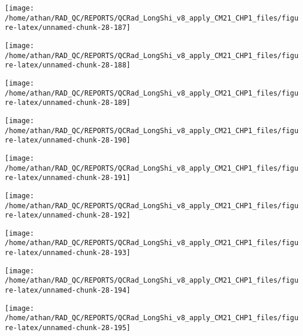 \documentclass[
  10pt,
  a4paper,oneside]{article}
\begin{document}
\begin{center}\texttt{[image: /home/athan/RAD\_QC/REPORTS/QCRad\_LongShi\_v8\_apply\_CM21\_CHP1\_files/figure-latex/unnamed-chunk-28-187]} \end{center}

\begin{center}\texttt{[image: /home/athan/RAD\_QC/REPORTS/QCRad\_LongShi\_v8\_apply\_CM21\_CHP1\_files/figure-latex/unnamed-chunk-28-188]} \end{center}

\begin{center}\texttt{[image: /home/athan/RAD\_QC/REPORTS/QCRad\_LongShi\_v8\_apply\_CM21\_CHP1\_files/figure-latex/unnamed-chunk-28-189]} \end{center}

\begin{center}\texttt{[image: /home/athan/RAD\_QC/REPORTS/QCRad\_LongShi\_v8\_apply\_CM21\_CHP1\_files/figure-latex/unnamed-chunk-28-190]} \end{center}

\begin{center}\texttt{[image: /home/athan/RAD\_QC/REPORTS/QCRad\_LongShi\_v8\_apply\_CM21\_CHP1\_files/figure-latex/unnamed-chunk-28-191]} \end{center}

\begin{center}\texttt{[image: /home/athan/RAD\_QC/REPORTS/QCRad\_LongShi\_v8\_apply\_CM21\_CHP1\_files/figure-latex/unnamed-chunk-28-192]} \end{center}

\begin{center}\texttt{[image: /home/athan/RAD\_QC/REPORTS/QCRad\_LongShi\_v8\_apply\_CM21\_CHP1\_files/figure-latex/unnamed-chunk-28-193]} \end{center}

\begin{center}\texttt{[image: /home/athan/RAD\_QC/REPORTS/QCRad\_LongShi\_v8\_apply\_CM21\_CHP1\_files/figure-latex/unnamed-chunk-28-194]} \end{center}

\begin{center}\texttt{[image: /home/athan/RAD\_QC/REPORTS/QCRad\_LongShi\_v8\_apply\_CM21\_CHP1\_files/figure-latex/unnamed-chunk-28-195]} \end{center}
\end{document}

